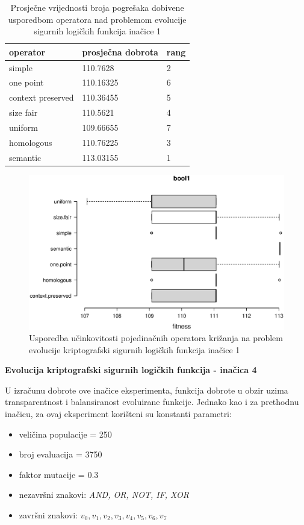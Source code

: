 \begin{table}[H]
 	\centering

    \begin{tabular}{| l | l | l |}
    \hline
    \textbf{operator} & \textbf{prosječna dobrota} & \textbf{rang}\\ \hline
    simple & 110.7628 & 2\\ \hline
    one point & 110.16325 & 6\\ \hline
    context preserved & 110.36455 & 5\\ \hline
    size fair & 110.5621 & 4\\ \hline
    uniform & 109.66655 & 7\\ \hline
    homologous & 110.76225 & 3\\ \hline
    semantic & 113.03155 & 1\\ \hline
    \end{tabular}
    
    \caption{Prosječne vrijednosti broja pogrešaka dobivene usporedbom operatora nad problemom evolucije sigurnih logičkih funkcija inačice 1}
    \label{bool1table}
\end{table}

\begin{figure}[H]
	\centering
	\includegraphics[trim=0cm 4cm 0cm 0cm, scale=0.5]{./slike/boxPlots/bool1.eps}
	\caption{Usporedba učinkovitosti pojedinačnih operatora križanja na problem evolucije kriptografski sigurnih logičkih funkcija inačice 1}
	\label{bool1box}
\end{figure}


\textbf{Evolucija kriptografski sigurnih logičkih funkcija - inačica 4}

U izračunu dobrote ove inačice eksperimenta, funkcija dobrote u obzir uzima transparentnost i balansiranost evoluirane funkcije. Jednako kao i za prethodnu inačicu, za  ovaj eksperiment korišteni su konstanti parametri:
\begin{itemize}
\item{veličina populacije = 250}
\item{broj evaluacija = 3750}
\item{faktor mutacije = 0.3}
\item{nezavršni znakovi: \textit{AND, OR, NOT, IF, XOR}}
\item{završni znakovi: \textit{$v_0, v_1, v_2, v_3, v_4, v_5, v_6, v_7$}}
\end{itemize}

